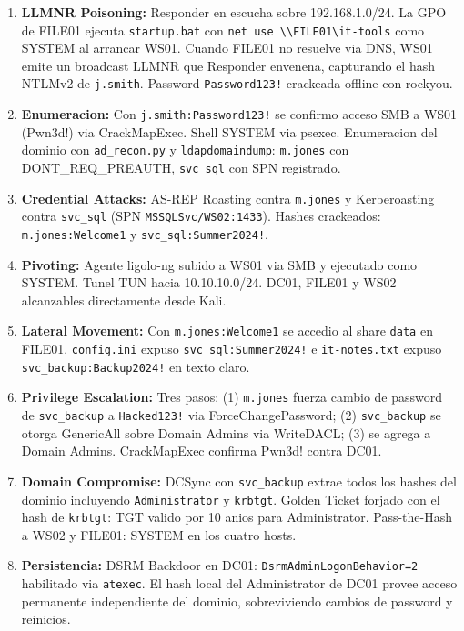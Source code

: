 \documentclass[11pt,a4paper]{article}
\begin{document}
\begin{enumerate}[leftmargin=*, label=\textbf{Paso \arabic*.}]
  \item \textbf{LLMNR Poisoning:} Responder en escucha sobre 192.168.1.0/24.
    La GPO de FILE01 ejecuta \texttt{startup.bat} con \texttt{net use \textbackslash\textbackslash FILE01\textbackslash it-tools} como SYSTEM al arrancar WS01.
    Cuando FILE01 no resuelve via DNS, WS01 emite un broadcast LLMNR que Responder
    envenena, capturando el hash NTLMv2 de \texttt{j.smith}. Password
    \texttt{Password123!} crackeada offline con rockyou.

  \item \textbf{Enumeracion:} Con \texttt{j.smith:Password123!} se confirmo
    acceso SMB a WS01 (Pwn3d!) via CrackMapExec. Shell SYSTEM via psexec.
    Enumeracion del dominio con \texttt{ad\_recon.py} y \texttt{ldapdomaindump}:
    \texttt{m.jones} con DONT\_REQ\_PREAUTH, \texttt{svc\_sql} con SPN registrado.

  \item \textbf{Credential Attacks:} AS-REP Roasting contra \texttt{m.jones}
    y Kerberoasting contra \texttt{svc\_sql} (SPN \texttt{MSSQLSvc/WS02:1433}).
    Hashes crackeados: \texttt{m.jones:Welcome1} y \texttt{svc\_sql:Summer2024!}.

  \item \textbf{Pivoting:} Agente ligolo-ng subido a WS01 via SMB y ejecutado
    como SYSTEM. Tunel TUN hacia 10.10.10.0/24. DC01, FILE01 y WS02 alcanzables
    directamente desde Kali.

  \item \textbf{Lateral Movement:} Con \texttt{m.jones:Welcome1} se accedio
    al share \texttt{data} en FILE01. \texttt{config.ini} expuso
    \texttt{svc\_sql:Summer2024!} e \texttt{it-notes.txt} expuso
    \texttt{svc\_backup:Backup2024!} en texto claro.

  \item \textbf{Privilege Escalation:} Tres pasos: (1) \texttt{m.jones}
    fuerza cambio de password de \texttt{svc\_backup} a \texttt{Hacked123!}
    via ForceChangePassword; (2) \texttt{svc\_backup} se otorga GenericAll
    sobre Domain Admins via WriteDACL; (3) se agrega a Domain Admins.
    CrackMapExec confirma Pwn3d! contra DC01.

  \item \textbf{Domain Compromise:} DCSync con \texttt{svc\_backup} extrae todos
    los hashes del dominio incluyendo \texttt{Administrator} y \texttt{krbtgt}.
    Golden Ticket forjado con el hash de \texttt{krbtgt}: TGT valido por
    10 anios para Administrator. Pass-the-Hash a WS02 y FILE01: SYSTEM en
    los cuatro hosts.

  \item \textbf{Persistencia:} DSRM Backdoor en DC01: \texttt{DsrmAdminLogonBehavior=2}
    habilitado via \texttt{atexec}. El hash local del Administrator de DC01
    provee acceso permanente independiente del dominio, sobreviviendo cambios
    de password y reinicios.
\end{enumerate}
\end{document}
